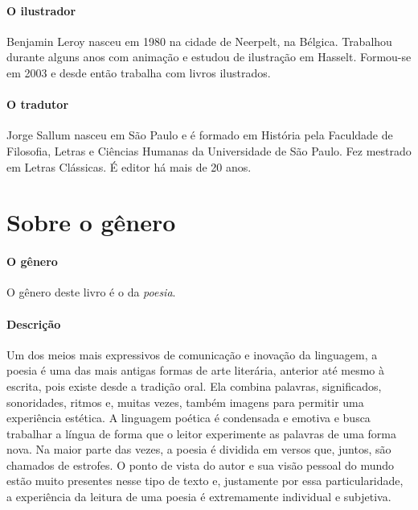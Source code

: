 \documentclass[11pt]{extarticle}
\begin{document}
\paragraph{O ilustrador} Benjamin Leroy nasceu em 1980 na cidade de Neerpelt, na Bélgica. Trabalhou durante alguns anos com animação e estudou de ilustração em Hasselt. Formou-se em 2003 e desde então trabalha com livros ilustrados.

\paragraph{O tradutor} Jorge Sallum nasceu em São Paulo e é formado em História pela Faculdade de Filosofia, Letras e Ciências Humanas da Universidade de São Paulo. Fez mestrado em Letras Clássicas. É editor há mais de 20 anos.   



\section{Sobre o gênero}

\paragraph{O gênero} O gênero deste livro é o da \textit{poesia}. 

\paragraph{Descrição} Um dos meios mais expressivos de comunicação e inovação da linguagem, a poesia é uma das mais antigas formas de arte literária, anterior até mesmo à escrita, pois existe desde a tradição oral. Ela combina palavras, significados, sonoridades, ritmos e, muitas vezes, também imagens para permitir uma experiência estética. A linguagem poética é condensada e emotiva e busca trabalhar a língua de forma que o leitor experimente as palavras de uma forma nova. Na maior parte das vezes, a poesia é dividida em versos que, juntos, são chamados de estrofes. O ponto de vista do autor e sua visão pessoal do mundo estão muito presentes nesse tipo de texto e, justamente por essa particularidade, a experiência da leitura de uma poesia é extremamente individual e subjetiva.
\end{document}
